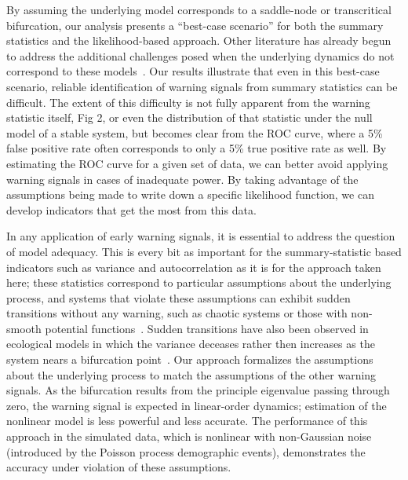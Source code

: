 \documentclass{pnastwo}
\begin{document}
\begin{article}

By assuming the underlying model corresponds to a saddle-node or transcritical bifurcation,
our analysis presents a ``best-case scenario'' for both the summary statistics and the likelihood-based approach. 
Other literature has already begun to address the additional challenges posed when the underlying 
dynamics do not correspond to these models~\cite{Hastings2010}.
Our results illustrate that even in this best-case scenario, 
reliable identification of warning signals from summary statistics can be difficult.  
The extent of this difficulty is not fully apparent from the warning statistic itself, Fig 2,
or even the distribution of that statistic under the null model of a stable system, 
but becomes clear from the ROC curve, where a 5\% false positive rate often corresponds to only a 5\% true positive rate as well.  
By estimating the ROC curve for a given set of data, 
we can better avoid applying warning signals in cases of inadequate power.
By taking advantage of the assumptions being made to write down a specific likelihood function,
we can develop indicators that get the most from this data.  


In any application of early warning signals, it is essential to address the question of model adequacy.  
This is every bit as important for the summary-statistic based indicators such as variance and autocorrelation
as it is for the approach taken here; these statistics correspond to particular assumptions about the underlying process,
and systems that violate these assumptions can exhibit sudden transitions without any warning,
such as chaotic systems or those with non-smooth potential functions~\cite{Hastings2010}.
Sudden transitions have also been observed in ecological models in which 
the variance deceases rather then increases as the system nears a bifurcation point~\cite{Schreiber2003, Schreiber2008}.  
Our approach formalizes the assumptions about the underlying process to match the assumptions of the other warning signals.  
As the bifurcation results from the principle eigenvalue passing through zero, 
the warning signal is expected in linear-order dynamics;
estimation of the nonlinear model is less powerful and less accurate.  
The performance of this approach in the simulated data, which is nonlinear with non-Gaussian noise 
(introduced by the Poisson process demographic events), 
demonstrates the accuracy under violation of these assumptions.  


\end{article}
\end{document}
